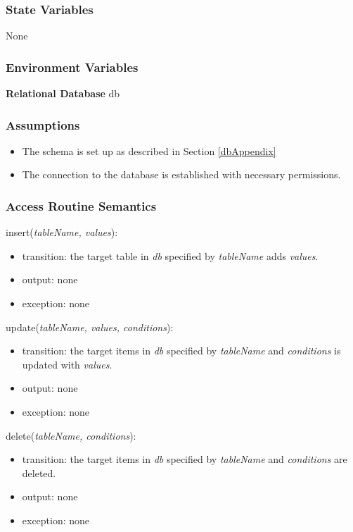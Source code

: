 \documentclass[12pt, titlepage]{article}
\begin{document}
\subsubsection{State Variables}
None

\subsubsection{Environment Variables}
\textbf{Relational Database} db

\subsubsection{Assumptions}
\begin{itemize}
  \item The schema is set up as described in Section \ref{dbAppendix}
  \item The connection to the database is established with necessary permissions.
\end{itemize}

\subsubsection{Access Routine Semantics}

\noindent insert(\textit{tableName, values}):
\begin{itemize}
\item transition: the target table in \textit{db} specified by \textit{tableName} adds \textit{values}.
\item output: none
\item exception: none
\end{itemize}

\noindent update(\textit{tableName, values, conditions}):
\begin{itemize}
\item transition: the target items in \textit{db} specified by \textit{tableName} and \textit{conditions} is updated with \textit{values}.
\item output: none
\item exception: none
\end{itemize}

\noindent delete(\textit{tableName, conditions}):
\begin{itemize}
\item transition: the target items in \textit{db} specified by \textit{tableName} and \textit{conditions} are deleted.
\item output: none
\item exception: none
\end{itemize}
\end{document}
